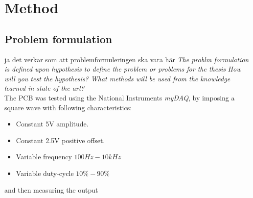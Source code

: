 \section{Method}
\subsection{Problem formulation}
ja det verkar som att problemformuleringen ska vara här
\textit{The problm formulation is defined upon hypothesis to define the problem or problems for the thesis}
\textit{How will you test the hypothesis? What methods will be used from the knowledge learned in state of the art?}
\\The PCB was tested using the National Instruments \textit{myDAQ}, by imposing a square wave with following characteristics:
\begin{itemize}
        \item Constant 5V amplitude.
        \item Constant 2.5V positive offset.
        \item Variable frequency $100Hz-10kHz$
        \item Variable duty-cycle $10\% - 90\%$
\end{itemize}
and then measuring the output
